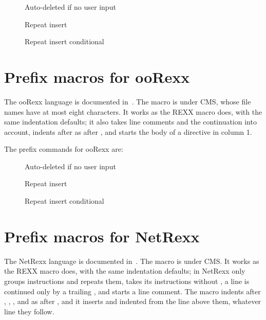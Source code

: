 \documentclass[11pt]{article}
\begin{document}
\begin{description}
\item[{}] Auto-deleted if no user input

\item[{}] Repeat insert
\item[{}] Repeat insert conditional
\end{description}

\section*{Prefix macros for ooRexx}

The ooRexx language is documented in~\cite{oorexxref}. The macro  is  under CMS, whose file names have at most eight characters. It works as the REXX macro does, with the same indentation defaults; it also takes \constant{-\/-} line comments and the \constant{-} continuation into account, indents after  as after , and starts the body of a directive in column 1.

The prefix commands for ooRexx are:

\begin{description}
\item[{}] Auto-deleted if no user input

\item[{}] Repeat insert
\item[{}] Repeat insert conditional
\end{description}

\section*{Prefix macros for NetRexx}

The NetRexx language is documented in~\cite{netrexxlr}. The macro  is  under CMS. It works as the REXX macro does, with the same indentation defaults; in NetRexx  only groups instructions and  repeats them,  takes its instructions without , a line is continued only by a trailing \constant{-}, and \constant{-\/-} starts a line comment. The macro indents after , , ,  and  as after , and it inserts  and  indented from the  line above them, whatever line they follow.
\end{document}
